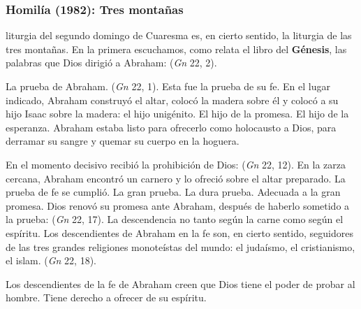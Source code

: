 \newpage 

\subsubsection{Homilía (1982): Tres montañas}


\begin{body}
 liturgia del segundo domingo de Cuaresma es, en cierto sentido, la liturgia de las tres montañas. En la primera escuchamos, como relata el libro del \textbf{Génesis}, las palabras que Dios dirigió a Abraham:  (\textit{Gn} 22, 2).

La prueba de Abraham.  (\textit{Gn} 22, 1). Esta fue la prueba de su fe. En el lugar indicado, Abraham construyó el altar, colocó la madera sobre él y colocó a su hijo Isaac sobre la madera: el hijo unigénito. El hijo de la promesa. El hijo de la esperanza. Abraham estaba listo para ofrecerlo como holocausto a Dios, para derramar su sangre y quemar su cuerpo en la hoguera.

En el momento decisivo recibió la prohibición de Dios:  (\textit{Gn} 22, 12). En la zarza cercana, Abraham encontró un carnero y lo ofreció sobre el altar preparado. La prueba de fe se cumplió. La gran prueba. La dura prueba. Adecuada a la gran promesa. Dios renovó su promesa ante Abraham, después de haberlo sometido a la prueba:  (\textit{Gn} 22, 17). La descendencia no tanto según la carne como según el espíritu. Los descendientes de Abraham en la fe son, en cierto sentido, seguidores de las tres grandes religiones monoteístas del mundo: el judaísmo, el cristianismo, el islam.  (\textit{Gn} 22, 18).

Los descendientes de la fe de Abraham creen que Dios tiene el poder de probar al hombre. Tiene derecho a ofrecer de su espíritu.


\end{body}
